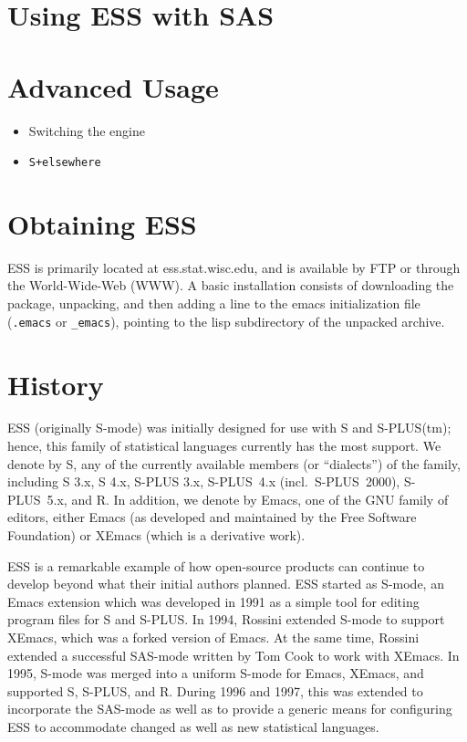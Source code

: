 \documentclass{article}
\newcommand*{\Splus}{\textsc{S-PLUS}}
\begin{document}
\section{Using ESS with SAS}
\label{sec:SAS}



\section{Advanced Usage}
\label{sec:advanced}

\begin{itemize}
\item Switching the engine
\item \texttt{S+elsewhere}

\end{itemize}

\section{Obtaining ESS}
\label{sec:getIt}

ESS is primarily located at ess.stat.wisc.edu, and is available by FTP
or through the World-Wide-Web (WWW).  A basic installation consists of
downloading the package, unpacking, and then adding a line to the
emacs initialization file (\verb+.emacs+ or \verb+_emacs+), pointing
to the lisp subdirectory of the unpacked archive.

\section{History}
\label{sec:history}

ESS (originally S-mode) was initially designed for use with S and
\Splus(tm); hence, this family of statistical languages currently has
the most support.  We denote by S, any of the currently available
members (or ``dialects'') of the family, including S 3.x, S 4.x, \Splus
3.x, \Splus~4.x (incl.\ \Splus~2000), \Splus~5.x, and R.  In addition, we
denote by Emacs, one of the GNU family of editors, either Emacs (as
developed and maintained by the Free Software Foundation) or XEmacs (which
is a derivative work).

ESS is a remarkable example of how open-source products can continue
to develop beyond what their initial authors planned.  ESS started as
S-mode, an Emacs extension which was developed in 1991 as a simple
tool for editing program files for S and \Splus.  In 1994, Rossini
extended S-mode to support XEmacs, which was a forked version of
Emacs.  At the same time, Rossini extended a successful SAS-mode
written by Tom Cook to work with XEmacs.  In 1995, S-mode was merged
into a uniform S-mode for Emacs, XEmacs, and supported S, \Splus, and
R. During 1996 and 1997, this was extended to incorporate the
SAS-mode as well as to provide a generic means for configuring ESS to
accommodate changed as well as new statistical languages.
\end{document}

